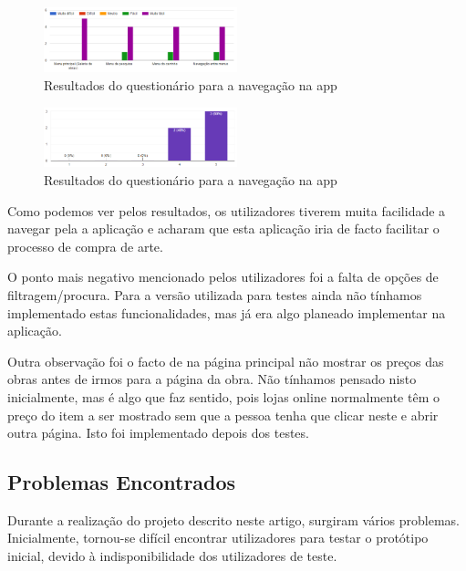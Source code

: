 \documentclass[conference]{IEEEtran}
\begin{document}
\begin{figure}[ht]
    \centering
    \includegraphics[width=0.5\textwidth]{questionarioNavegacao.png}
    \caption{Resultados do questionário para a navegação na app}
    \label{fig:navegacaoTest}
\end{figure}

\begin{figure}[ht]
    \centering
    \includegraphics[width=0.5\textwidth]{questionarioFacilitar.png}
    \caption{Resultados do questionário para a navegação na app}
    \label{fig:facilitaTest}
\end{figure}

Como podemos ver pelos resultados, os utilizadores tiverem muita facilidade a navegar 
pela a aplicação e acharam que esta aplicação iria de facto facilitar o processo de compra de arte.

O ponto mais negativo mencionado pelos utilizadores foi a falta de opções de filtragem/procura. 
Para a versão utilizada para testes ainda não tínhamos implementado estas funcionalidades, 
mas já era algo planeado implementar na aplicação.

Outra observação foi o facto de na página principal não mostrar os preços das obras 
antes de irmos para a página da obra. Não tínhamos pensado nisto inicialmente, 
mas é algo que faz sentido, pois lojas online normalmente têm o preço do item a ser 
mostrado sem que a pessoa tenha que clicar neste e abrir outra página. 
Isto foi implementado depois dos testes.

\subsection{Problemas Encontrados}

Durante a realização do projeto descrito neste artigo, surgiram vários problemas. Inicialmente, tornou-se difícil 
encontrar utilizadores para testar o protótipo inicial, devido à indisponibilidade dos utilizadores de teste. 
\end{document}
